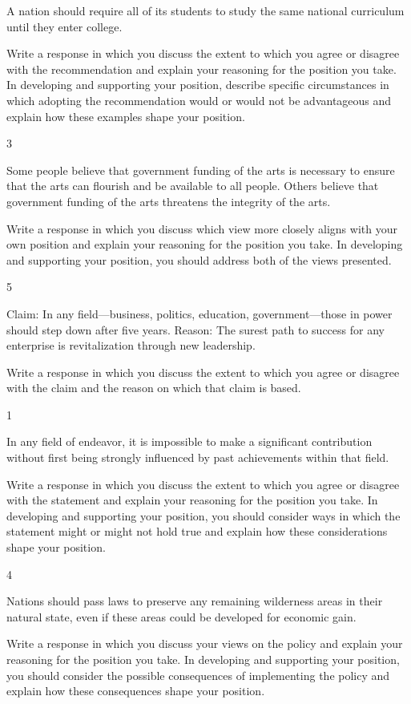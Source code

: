 \documentclass[]{article}
\begin{document}
A nation should require all of its students to study the same national
curriculum until they enter college.

Write a response in which you discuss the extent to which you agree or
disagree with the recommendation and explain your reasoning for the
position you take. In developing and supporting your position, describe
specific circumstances in which adopting the recommendation would or
would not be advantageous and explain how these examples shape your
position.

3

Some people believe that government funding of the arts is necessary to
ensure that the arts can flourish and be available to all people. Others
believe that government funding of the arts threatens the integrity of
the arts.

Write a response in which you discuss which view more closely aligns
with your own position and explain your reasoning for the position you
take. In developing and supporting your position, you should address
both of the views presented.

5

Claim: In any field---business, politics, education, government---those
in power should step down after five years. Reason: The surest path to
success for any enterprise is revitalization through new leadership.

Write a response in which you discuss the extent to which you agree or
disagree with the claim and the reason on which that claim is based.

1

In any field of endeavor, it is impossible to make a significant
contribution without first being strongly influenced by past
achievements within that field.

Write a response in which you discuss the extent to which you agree or
disagree with the statement and explain your reasoning for the position
you take. In developing and supporting your position, you should
consider ways in which the statement might or might not hold true and
explain how these considerations shape your position.

4

Nations should pass laws to preserve any remaining wilderness areas in
their natural state, even if these areas could be developed for economic
gain.

Write a response in which you discuss your views on the policy and
explain your reasoning for the position you take. In developing and
supporting your position, you should consider the possible consequences
of implementing the policy and explain how these consequences shape your
position.
\end{document}
